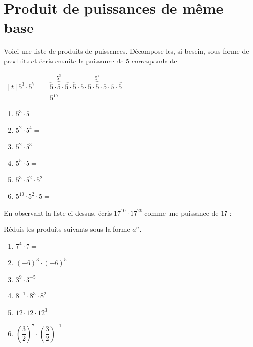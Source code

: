 \documentclass[../../syllabus_2.tex]{subfiles}
\begin{document}
\section{Produit de puissances de même base}
Voici une liste de produits de puissances. Décompose-les, si besoin, sous forme de produits et écris ensuite la puissance de \(5\) correspondante.

\exemple
\(\begin{aligned}[t]
	5^3 \cdot 5^7 & = \overbrace{5 \cdot 5 \cdot 5}^{5^3} \cdot \overbrace{5 \cdot 5 \cdot 5 \cdot 5 \cdot 5 \cdot 5 \cdot 5}^{5^7} \\
	              & = 5^{10}
\end{aligned}\)

\begin{enumerate}[cols=2, itemsep=2.5cm]
	\item \(5^3 \cdot 5=\)
	\item \(5^2 \cdot 5^4=\)
	\item \(5^2 \cdot 5^3=\)
	\item \(5^5 \cdot 5=\)
	\item \(5^3 \cdot 5^2 \cdot 5^2=\)
	\item \(5^{10} \cdot 5^2 \cdot 5=\)
\end{enumerate}
\vspace*{2cm}

En observant la liste ci-dessus, écris \(17^{10}\cdot17^{26}\) comme une puissance de \(17\) : \dotfill

\begin{center}
\end{center}

\newpage
\begin{exercise}
	Réduis les produits suivants sous la forme \(a^n\).
	\begin{enumerate} [cols=2, itemsep=2cm]
		\item \(7^4\cdot7=\)
		\item \((-6)^3\cdot(-6)^5=\)
		\item \(3^9\cdot 3^{-5}=\)
		\item \(8^{-1}\cdot 8^3\cdot 8^2=\)
		\item \(12\cdot 12\cdot 12^3=\)
		\item \(\left(\dfrac{3}{2}\right)^7\cdot\left(\dfrac{3}{2}\right)^{-1}=\)
	\end{enumerate}
	\vspace{2cm}
\end{exercise}
\end{document}
